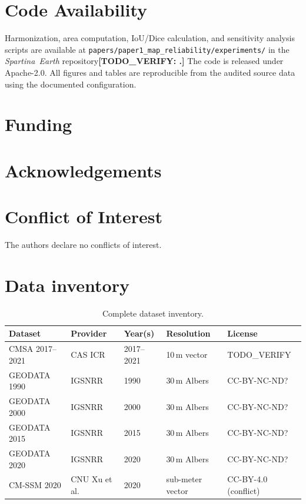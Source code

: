 \documentclass[11pt]{article}
\newcommand{\TODOVERIFY}[1]{\textcolor{todocolor}{\textbf{[TODO_VERIFY: #1]}}}
\begin{document}
\section*{Code Availability}

Harmonization, area computation, IoU/Dice calculation, and sensitivity analysis
scripts are available at \texttt{papers/paper1\_map\_reliability/experiments/}
in the \textit{Spartina~Earth} repository\TODOVERIFY. The code is released under
Apache-2.0. All figures and tables are reproducible from the audited source data
using the documented configuration.

\section*{Funding}


\section*{Acknowledgements}


\section*{Conflict of Interest}

The authors declare no conflicts of interest.




\appendix
\section{Data inventory}
\label{app:data}

\begin{table}[htpb]
\centering
\caption{\label{tab:data_inv}Complete dataset inventory.}
\begin{tabular}{l l l l l}
\toprule
Dataset & Provider & Year(s) & Resolution & License \\
\midrule
CMSA 2017--2021 & CAS ICR & 2017--2021 & 10\,m vector & TODO\_VERIFY \\
GEODATA 1990 & IGSNRR & 1990 & 30\,m Albers & CC-BY-NC-ND? \\
GEODATA 2000 & IGSNRR & 2000 & 30\,m Albers & CC-BY-NC-ND? \\
GEODATA 2015 & IGSNRR & 2015 & 30\,m Albers & CC-BY-NC-ND? \\
GEODATA 2020 & IGSNRR & 2020 & 30\,m Albers & CC-BY-NC-ND? \\
CM-SSM 2020 & CNU Xu et al. & 2020 & sub-meter vector & CC-BY-4.0 (conflict) \\
\bottomrule
\end{tabular}
\end{table}
\end{document}
